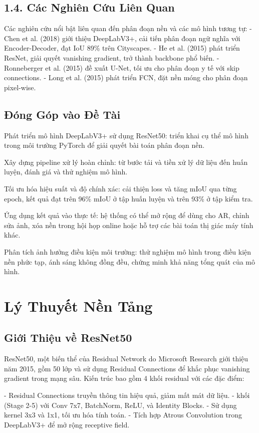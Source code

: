 \documentclass[12pt]{report}
\begin{document}
\section*{1.4. Các Nghiên Cứu Liên Quan}
Các nghiên cứu nổi bật liên quan đến phân đoạn nền và các mô hình tương tự:
- Chen et al. (2018) giới thiệu DeepLabV3+, cải tiến phân đoạn ngữ nghĩa với Encoder-Decoder, đạt IoU 89\% trên Cityscapes.
- He et al. (2015) phát triển ResNet, giải quyết vanishing gradient, trở thành backbone phổ biến.
- Ronneberger et al. (2015) đề xuất U-Net, tối ưu cho phân đoạn y tế với skip connections.
- Long et al. (2015) phát triển FCN, đặt nền móng cho phân đoạn pixel-wise.

\section*{Đóng Góp vào Đề Tài}
Phát triển mô hình DeepLabV3+ sử dụng ResNet50: triển khai cụ thể mô hình trong môi trường PyTorch để giải quyết bài toán phân đoạn nền.

Xây dựng pipeline xử lý hoàn chỉnh: từ bước tải và tiền xử lý dữ liệu đến huấn luyện, đánh giá và thử nghiệm mô hình.

Tối ưu hóa hiệu suất và độ chính xác: cải thiện loss và tăng mIoU qua từng epoch, kết quả đạt trên 96\% mIoU ở tập huấn luyện và trên 93\% ở tập kiểm tra.

Ứng dụng kết quả vào thực tế: hệ thống có thể mở rộng để dùng cho AR, chỉnh sửa ảnh, xóa nền trong hội họp online hoặc hỗ trợ các bài toán thị giác máy tính khác.

Phân tích ảnh hưởng điều kiện môi trường: thử nghiệm mô hình trong điều kiện nền phức tạp, ánh sáng không đồng đều, chứng minh khả năng tổng quát của mô hình.

\chapter*{Lý Thuyết Nền Tảng}
\section*{Giới Thiệu về ResNet50}
ResNet50, một biến thể của Residual Network do Microsoft Research giới thiệu năm 2015, gồm 50 lớp và sử dụng Residual Connections để khắc phục vanishing gradient trong mạng sâu. Kiến trúc bao gồm 4 khối residual với các đặc điểm:

- Residual Connections truyền thông tin hiệu quả, giảm mất mát dữ liệu.
- khối (Stage 2-5) với Conv 7x7, BatchNorm, ReLU, và Identity Blocks.
- Sử dụng kernel 3x3 và 1x1, tối ưu hóa tính toán.
- Tích hợp Atrous Convolution trong DeepLabV3+ để mở rộng receptive field.
\end{document}
